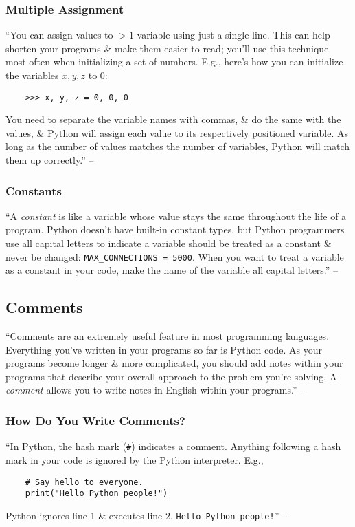 \documentclass[oneside]{book}
\numberwithin{equation}{section}
\begin{document}
\subsubsection{Multiple Assignment}
``You can assign values to $> 1$ variable using just a single line. This can help shorten your programs \& make them easier to read; you'll use this technique most often when initializing a set of numbers. E.g., here's how you can initialize the variables $x,y,z$ to $0$:
\begin{verbatim}
	>>> x, y, z = 0, 0, 0
\end{verbatim}
You need to separate the variable names with commas, \& do the same with the values, \& Python will assign each value to its respectively positioned variable. As long as the number of values matches the number of variables, Python will match them up correctly.'' -- \cite[p. 28]{Matthes2019}

\subsubsection{Constants}
``A \textit{constant} is like a variable whose value stays the same throughout the life of a program. Python doesn't have built-in constant types, but Python programmers use all capital letters to indicate a variable should be treated as a constant \& never be changed: \verb|MAX_CONNECTIONS = 5000|. When you want to treat a variable as a constant in your code, make the name of the variable all capital letters.'' -- \cite[p. 28]{Matthes2019}

\subsection{Comments}
``Comments are an extremely useful feature in most programming languages. Everything you've written in your programs so far is Python code. As your programs become longer \& more complicated, you should add notes within your programs that describe your overall approach to the problem you're solving. A \textit{comment} allows you to write notes in English within your programs.'' -- \cite[p. 29]{Matthes2019}

\subsubsection{How Do You Write Comments?}
``In Python, the hash mark (\texttt{\#}) indicates a comment. Anything following a hash mark in your code is ignored by the Python interpreter. E.g.,
\begin{verbatim}
	# Say hello to everyone.
	print("Hello Python people!")
\end{verbatim}
Python ignores line 1 \& executes line 2. \verb|Hello Python people!|'' -- \cite[p. 29]{Matthes2019}
\end{document}
